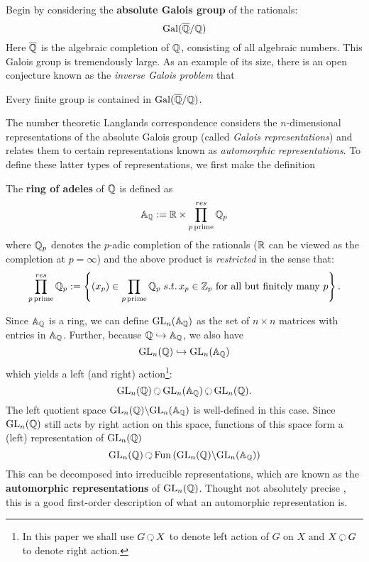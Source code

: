 Begin by considering the \textbf{absolute Galois group} of the rationals:
\[
	\mathrm{Gal}(\overline {\mathbb{Q}}/\mathbb{Q})
\]
Here $\overline {\mathbb{Q}}$ is the algebraic completion of $\mathbb{Q}$, consisting of all algebraic numbers. This Galois group is tremendously large. As an example of its size, there is an open conjecture known as the \emph{inverse Galois problem} that 
\begin{conj}
	Every finite group is contained in $\mathrm{Gal}(\overline {\mathbb{Q}}/\mathbb{Q})$.
\end{conj}
The number theoretic Langlands correspondence considers the $n$-dimensional representations of the absolute Galois group (called \emph{Galois representations}) and relates them to certain representations known as \emph{automorphic representations}. To define these latter types of representations, we first make the definition
\begin{defn}
	The \textbf{ring of adeles} of $\mathbb{Q}$ is defined as 
	\[
		\mathbb A_{\mathbb{Q}} := \mathbb{R} \times \prod_{p\, \mathrm{prime}}^{res} \mathbb{Q}_p
	\]
	where $\mathbb{Q}_p$ denotes the $p$-adic completion of the rationals \cite{bachman1964} ($\mathbb{R}$ can be viewed as the completion at $p=\infty$) and the above product is \emph{restricted} in the sense that:
	\[
		\prod_{p\, \mathrm{prime}}^{res} \mathbb{Q}_p := \left\{ (x_p) \in \prod_{p\, \mathrm{prime}} \mathbb{Q}_p \; s.t. \, x_p \in \mathbb Z_p \text{ for all but finitely many } p\right\}.
	\]
\end{defn}

Since $\mathbb A_{\mathbb{Q}}$ is a ring, we can define $\mathrm{GL}_n(\mathbb A_{\mathbb{Q}})$ as the set of $n \times n$ matrices with entries in $\mathbb A_{\mathbb{Q}}$. Further, because $\mathbb{Q} \hookrightarrow \mathbb A_{\mathbb{Q}}$, we also have 
\[
	\mathrm{GL}_n(\mathbb{Q}) \hookrightarrow \mathrm{GL}_n(\mathbb A_{\mathbb{Q}})
\]
which yields a left (and right) action\footnote{In this paper we shall use $G\lacts X$ to denote left action of $G$ on $X$ and $X \racts G$ to denote right action.}:
\[
	\GL_n(\qq) \lacts  \GL_n(\mathbb A_\qq) \racts  \GL_n(\qq).
\]
The left quotient space $\mathrm{GL}_n(\mathbb{Q}) \backslash \mathrm{GL}_n(\mathbb A_{\mathbb{Q}})$ is well-defined in this case. Since $\mathrm{GL}_n(\mathbb{Q})$ still acts by right action on this space, functions of this space form a (left) representation of $\mathrm{GL}_n(\mathbb{Q})$
\[
	\GL_n(\qq) \lacts \mathrm{Fun}\left( \GL_n(\qq) \backslash \GL_n(\mathbb A_\qq) \right)
\]
This can be decomposed into irreducible representations, which are known as the \textbf{automorphic representations} of $\mathrm{GL}_n(\mathbb{Q})$.
Thought not absolutely precise \cite{Yoo18}, this is a good first-order description of what an automorphic representation is. 

